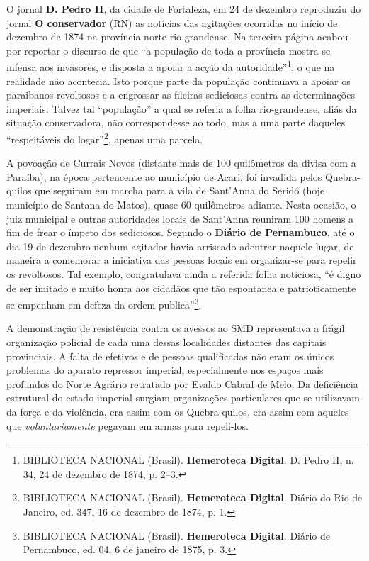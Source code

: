\begin{refsection}
O jornal \textbf{D. Pedro II}, da cidade de Fortaleza, em 24 de dezembro reproduziu do jornal \textbf{O conservador} (RN) as notícias das agitações ocorridas no início de dezembro de 1874 na província norte-rio-grandense. Na terceira página acabou por reportar o discurso de que “a população de toda a província mostra-se infensa aos invasores, e disposta a apoiar a acção da autoridade”\footnote{BIBLIOTECA NACIONAL (Brasil). \textbf{Hemeroteca Digital}. D. Pedro II, n. 34, 24 de dezembro de 1874, p. 2--3.}, o que na realidade não acontecia. Isto porque parte da população continuava a apoiar os paraibanos revoltosos e a engrossar as fileiras sediciosas contra as determinações imperiais. Talvez tal “população” a qual se referia a folha rio-grandense, aliás da situação conservadora, não correspondesse ao todo, mas a uma parte daqueles “respeitáveis do logar”\footnote{BIBLIOTECA NACIONAL (Brasil). \textbf{Hemeroteca Digital}. Diário do Rio de Janeiro, ed. 347, 16 de dezembro de 1874, p. 1.}, apenas uma parcela.  

A povoação de Currais Novos (distante mais de 100 quilômetros da divisa com a Paraíba), na época pertencente ao município de Acari, foi invadida pelos Quebra-quilos que seguiram em marcha para a vila de Sant’Anna do Seridó (hoje município de Santana do Matos), quase 60 quilômetros adiante. Nesta ocasião, o juiz municipal e outras autoridades locais de Sant’Anna reuniram 100 homens a fim de frear o ímpeto dos sediciosos. Segundo o \textbf{Diário de Pernambuco}, até o dia 19 de dezembro nenhum agitador havia arriscado adentrar naquele lugar, de maneira a comemorar a iniciativa das pessoas locais em organizar-se para repelir os revoltosos. Tal exemplo, congratulava ainda a referida folha noticiosa, “é digno de ser imitado e muito honra aos cidadãos que tão espontanea e patrioticamente se empenham em defeza da ordem publica”\footnote{BIBLIOTECA NACIONAL (Brasil). \textbf{Hemeroteca Digital}. Diário de Pernambuco, ed. 04, 6 de janeiro de 1875, p. 3.}.

A demonstração de resistência contra os avessos ao SMD representava a frágil organização policial de cada uma dessas localidades distantes das capitais provinciais. A falta de efetivos e de pessoas qualificadas não eram os únicos problemas do aparato repressor imperial, especialmente nos espaços mais profundos do Norte Agrário retratado por Evaldo Cabral de Melo. Da deficiência estrutural do estado imperial surgiam organizações particulares que se utilizavam da força e da violência, era assim com os Quebra-quilos, era assim com aqueles que \textit{voluntariamente} pegavam em armas para repeli-los.  


\end{refsection}
